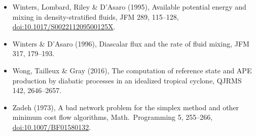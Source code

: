 \documentclass[11pt,a4paper]{article}
\newcommand{\doi}[1]{\href{https://doi.org/#1}{doi:#1}}
\begin{document}
\begin{itemize}
  \item Winters, Lombard, Riley \& D'Asaro (1995), Available potential energy and mixing in density-stratified fluids,
        JFM 289, 115--128, \doi{10.1017/S002211209500125X}.
  \item Winters \& D'Asaro (1996), Diascalar flux and the rate of fluid mixing, JFM 317, 179--193.
  \item Wong, Tailleux \& Gray (2016), The computation of reference state and APE production by diabatic processes in an
        idealized tropical cyclone, QJRMS 142, 2646--2657.
  \item Zadeh (1973), A bad network problem for the simplex method and other minimum cost flow algorithms, Math.\ Programming
        5, 255--266, \doi{10.1007/BF01580132}.
\end{itemize}
\end{document}

